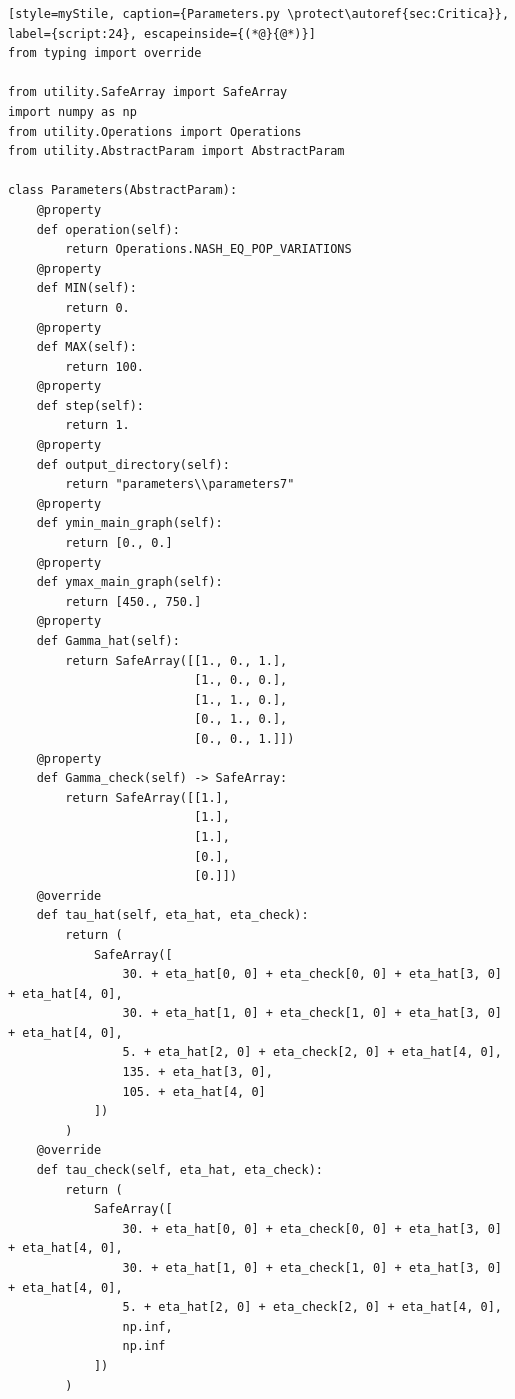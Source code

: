 \begin{lstlisting}[style=myStile, caption={Parameters.py \protect\autoref{sec:Critica}}, label={script:24}, escapeinside={(*@}{@*)}]
from typing import override

from utility.SafeArray import SafeArray
import numpy as np
from utility.Operations import Operations
from utility.AbstractParam import AbstractParam

class Parameters(AbstractParam):
    @property
    def operation(self):
        return Operations.NASH_EQ_POP_VARIATIONS
    @property
    def MIN(self):
        return 0.
    @property
    def MAX(self):
        return 100.
    @property
    def step(self):
        return 1.  
    @property
    def output_directory(self):
        return "parameters\\parameters7"
    @property
    def ymin_main_graph(self):
        return [0., 0.]
    @property
    def ymax_main_graph(self):
        return [450., 750.]
    @property
    def Gamma_hat(self):
        return SafeArray([[1., 0., 1.],
                          [1., 0., 0.],
                          [1., 1., 0.],
                          [0., 1., 0.],
                          [0., 0., 1.]])
    @property
    def Gamma_check(self) -> SafeArray:
        return SafeArray([[1.],
                          [1.],
                          [1.],
                          [0.],
                          [0.]])
    @override
    def tau_hat(self, eta_hat, eta_check):        
        return (
            SafeArray([
                30. + eta_hat[0, 0] + eta_check[0, 0] + eta_hat[3, 0] + eta_hat[4, 0],
                30. + eta_hat[1, 0] + eta_check[1, 0] + eta_hat[3, 0] + eta_hat[4, 0],
                5. + eta_hat[2, 0] + eta_check[2, 0] + eta_hat[4, 0],
                135. + eta_hat[3, 0],
                105. + eta_hat[4, 0]
            ])
        )
    @override
    def tau_check(self, eta_hat, eta_check):
        return (
            SafeArray([
                30. + eta_hat[0, 0] + eta_check[0, 0] + eta_hat[3, 0] + eta_hat[4, 0],
                30. + eta_hat[1, 0] + eta_check[1, 0] + eta_hat[3, 0] + eta_hat[4, 0],
                5. + eta_hat[2, 0] + eta_check[2, 0] + eta_hat[4, 0],
                np.inf,
                np.inf
            ])
        )
\end{lstlisting}

